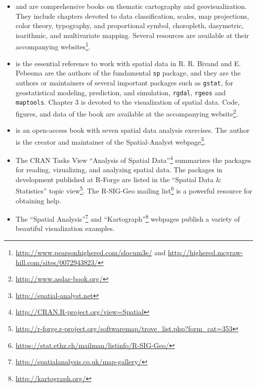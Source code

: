 \begin{itemize}

\item \cite{Slocum.McMaster.ea2005} and \cite{Dent.Torguson.ea2008}
  are comprehensive books on thematic cartography and
  geovisualization. They include chapters devoted to data
  classification, scales, map projections, color theory, typography,
  and proportional symbol, choropleth, dasymetric, isarithmic, and
  multivariate mapping. Several resources are available at their
  accompanying
  websites\footnote{\url{http://www.pearsonhighered.com/slocum3e/} and
    \url{http://highered.mcgraw-hill.com/sites/0072943823/}}.

\item \cite{Bivand.Pebesma.ea2008} is the essential reference to work
  with spatial data in \textsf{R}. R. Bivand and E. Pebesma are the
  authors of the fundamental \texttt{sp} package, and they are the
  authors or maintainers of several important packages such as
  \texttt{gstat}, for geostatistical modeling, prediction, and
  simulation, \texttt{rgdal}, \texttt{rgeos} and
  \texttt{maptools}. Chapter 3 is devoted to the visualization of
  spatial data. Code, figures, and data of the book are available at
  the accompanying website\footnote{\url{http://www.asdar-book.org/}}.

\item \cite{Hengl2009} is an open-access book with seven spatial
  data analysis exercises. The author is the creator and
  maintainer of the Spatial-Analyst
  webpage\footnote{\url{http://spatial-analyst.net}}.

\item The CRAN Tasks View ``Analysis of Spatial
  Data''\footnote{\url{http://CRAN.R-project.org/view=Spatial}}
  summarizes the packages for reading, vizualizing, and analyzing
  spatial data.  The packages in development published at R-Forge are
  listed in the ``Spatial Data \& Statistics'' topic
  view\footnote{\url{http://r-forge.r-project.org/softwaremap/trove_list.php?form_cat=353}}.
  The R-SIG-Geo mailing
  list\footnote{\url{https://stat.ethz.ch/mailman/listinfo/R-SIG-Geo/}}
  is a powerful resource for obtaining help.

\item The ``Spatial
  Analysis''\footnote{\url{http://spatialanalysis.co.uk/map-gallery/}}
  and ``Kartograph''\footnote{\url{http://kartograph.org/}} webpages
  publish a variety of beautiful visualization examples.

\end{itemize}


